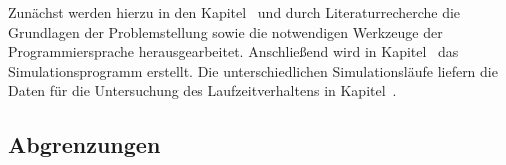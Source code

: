 Zunächst werden hierzu in den Kapitel~ und  durch Literaturrecherche die Grundlagen der Problemstellung sowie die notwendigen Werkzeuge der Programmiersprache herausgearbeitet. Anschließend wird in Kapitel~ das Simulationsprogramm erstellt. Die unterschiedlichen Simulationsläufe liefern die Daten für die Untersuchung des Laufzeitverhaltens in Kapitel~.


\subsection{Abgrenzungen} %
\label{sub:abgrenzungen}


